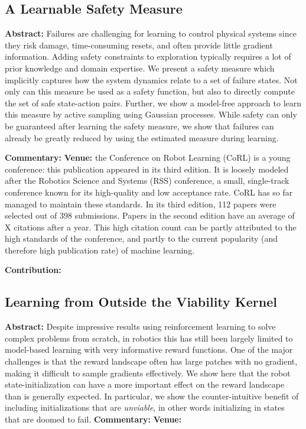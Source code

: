 \subsection{A Learnable Safety Measure}
\textbf{Abstract: }
Failures are challenging for learning to control physical systems since they risk damage, time-consuming resets, and often provide little gradient information. Adding safety constraints to exploration typically requires a lot of prior knowledge and domain expertise. We present a safety measure which implicitly captures how the system dynamics relate to a set of failure states. Not only can this measure be used as a safety function, but also to directly compute the set of safe state-action pairs. Further, we show a model-free approach to learn this measure by active sampling using Gaussian processes. While safety can only be guaranteed after learning the safety measure, we show that failures can already be greatly reduced by using the estimated measure during learning. \par
\textbf{Commentary: }
\textbf{Venue: }
the Conference on Robot Learning (CoRL) is a young conference: this publication appeared in its third edition. It is loosely modeled after the Robotics Science and Systems (RSS) conference, a small, single-track conference known for its high-quality and low acceptance rate. CoRL has so far managed to maintain these standards. In its third edition, 112 papers were selected out of 398 submissions. Papers in the second edition have an average of X citations after a year. This high citation count can be partly attributed to the high standards of the conference, and partly to the current popularity (and therefore high publication rate) of machine learning. \par

\textbf{Contribution: }



\subsection{Learning from Outside the Viability Kernel}
\textbf{Abstract: }
Despite impressive results using reinforcement learning to solve complex problems from scratch, in robotics this has still been largely limited to model-based learning with very informative reward functions. One of the major challenges is that the reward landscape often has large patches with no gradient, making it difficult to sample gradients effectively. We show here that the robot state-initialization can have a more important effect on the reward landscape than is generally expected. In particular, we show the counter-intuitive benefit of including initializations that are \emph{unviable}, in other words initializing in states that are doomed to fail.
\textbf{Commentary: }
\textbf{Venue: }

